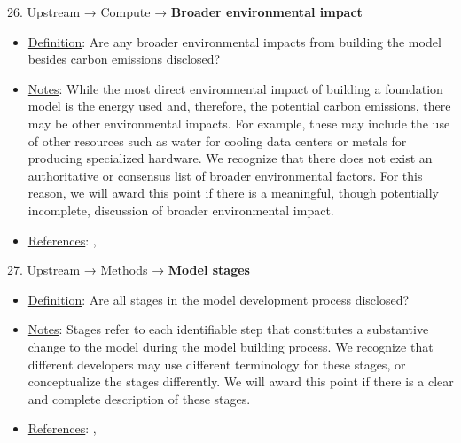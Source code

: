 26. Upstream → Compute → \textbf{Broader environmental impact}
\vspace{-\parskip}
\begin{itemize}
\item
\underline{Definition}: Are any broader environmental impacts from building the model besides carbon emissions disclosed?
\item
\underline{Notes}: While the most direct environmental impact of building a foundation model is the energy used and, therefore, the potential carbon emissions, there may be other environmental impacts. For example, these may include the use of other resources such as water for cooling data centers or metals for producing specialized hardware. We recognize that there does not exist an authoritative or consensus list of broader environmental factors. For this reason, we will award this point if there is a meaningful, though potentially incomplete, discussion of broader environmental impact.
\item
\underline{References}: \citet{luccioni2023counting}, \citet{strubell2019energy}
\end{itemize} \vspace{\baselineskip}


27. Upstream → Methods → \textbf{Model stages}
\vspace{-\parskip}
\begin{itemize}
\item
\underline{Definition}: Are all stages in the model development process disclosed?
\item
\underline{Notes}: Stages refer to each identifiable step that constitutes a substantive change to the model during the model building process. We recognize that different developers may use different terminology for these stages, or conceptualize the stages differently. We will award this point if there is a clear and complete description of these stages.
\item
\underline{References}: \citet{mitchell2019model}, \citet{chung2022scaling}
\end{itemize} \vspace{\baselineskip}


